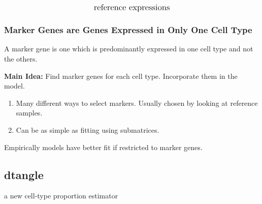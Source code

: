 \documentclass[usenames,dvipsnames,15pt,handout]{beamer}
\renewcommand{\alert}[1]{{\color{NavyBlue} #1}}
\begin{document}
\begin{frame}
\[\begin{aligned}
{{{  }}_{\text{\large reference expressions}}}
  \end{aligned}
  \]\vspace{-.5cm}
\end{frame}


\begin{frame}
  \frametitle{Marker Genes are Genes Expressed in Only One Cell Type}

  A \alert{marker gene} is one which is predominantly expressed in one cell type and not the others.

  {\bf Main Idea:} Find marker genes for each cell type. Incorporate them in the model. 
  \begin{enumerate}
  \item Many different ways to select markers. Usually chosen by looking at \alert{reference samples}.
  \item Can be as simple as fitting using submatrices.
  \end{enumerate}


  {\color{NavyBlue}Empirically models have better fit if restricted to marker genes.\newline}

    
\end{frame}

\setcounter{subsection}{0}

{ 
\begin{frame}[noframenumbering]
  \section{dtangle}
  \begin{center}a new cell-type proportion estimator\end{center}
\end{frame}
}
\end{document}
